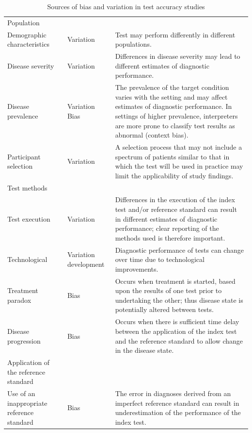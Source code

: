 \documentclass[
  11pt,
  a4paper,
  DIV=11,
  numbers=noendperiod]{scrreprt}
\begin{document}
\begin{longtable}[]{@{}
  >{\raggedright\arraybackslash}p{}
  >{\raggedright\arraybackslash}p{}
  >{\raggedright\arraybackslash}p{}@{}}
\caption{Sources of bias and variation in test accuracy
studies}\label{tbl-var}\tabularnewline
\toprule\noalign{}
\endfirsthead
\endhead
\bottomrule\noalign{}
\endlastfoot
Population & & \\
Demographic characteristics & Variation & Test may perform differently
in different populations. \\
Disease severity & Variation & Differences in disease severity may lead
to different estimates of diagnostic performance. \\
Disease prevalence & Variation Bias & The prevalence of the target
condition varies with the setting and may affect estimates of diagnostic
performance. In settings of higher prevalence, interpreters are more
prone to classify test results as abnormal (context bias). \\
Participant selection & Variation & A selection process that may not
include a spectrum of patients similar to that in which the test will be
used in practice may limit the applicability of study findings. \\
Test methods & & \\
Test execution & Variation & Differences in the execution of the index
test and/or reference standard can result in different estimates of
diagnostic performance; clear reporting of the methods used is therefore
important. \\
Technological & Variation development & Diagnostic performance of tests
can change over time due to technological improvements. \\
Treatment paradox & Bias & Occurs when treatment is started, based upon
the results of one test prior to undertaking the other; thus disease
state is potentially altered between tests. \\
Disease progression & Bias & Occurs when there is sufficient time delay
between the application of the index test and the reference standard to
allow change in the disease state. \\
Application of the reference standard & & \\
Use of an inappropriate reference standard & Bias & The error in
diagnoses derived from an imperfect reference standard can result in
underestimation of the performance of the index test. \\

\end{longtable}
\end{document}

